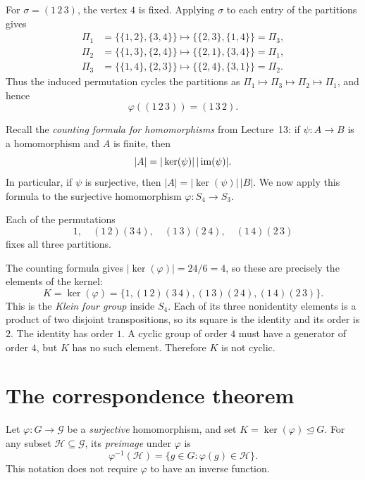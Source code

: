\documentclass[reqno,11pt]{amsart}
\begin{document}
\begin{example}
For $\sigma=(1\,2\,3)$, the vertex $4$ is fixed. Applying $\sigma$ to
each entry of the partitions gives
\[
\begin{aligned}
  \Pi_1&=\bigl\{\{1,2\},\{3,4\}\bigr\}
    \longmapsto\bigl\{\{2,3\},\{1,4\}\bigr\}=\Pi_3,\\
  \Pi_2&=\bigl\{\{1,3\},\{2,4\}\bigr\}
    \longmapsto\bigl\{\{2,1\},\{3,4\}\bigr\}=\Pi_1,\\
  \Pi_3&=\bigl\{\{1,4\},\{2,3\}\bigr\}
    \longmapsto\bigl\{\{2,4\},\{3,1\}\bigr\}=\Pi_2.
\end{aligned}
\]
Thus the induced permutation cycles the partitions as
$\Pi_1\mapsto\Pi_3\mapsto\Pi_2\mapsto\Pi_1$, and hence
\[
  \varphi((1\,2\,3))=(1\,3\,2).
\]
\end{example}

Recall the \emph{counting formula for homomorphisms} from Lecture~13:
if $\psi:A\to B$ is a homomorphism and $A$ is finite, then
\[
  |A|=|\ker(\psi)|\,|\operatorname{im}(\psi)|.
\]
In particular, if $\psi$ is surjective, then
$|A|=|\ker(\psi)|\,|B|$. We now apply this formula to the surjective
homomorphism $\varphi:S_4\to S_3$.

\begin{example}
Each of the permutations
\[
1,\quad (1\,2)(3\,4),\quad (1\,3)(2\,4),\quad (1\,4)(2\,3)
\]
fixes all three partitions.

The counting formula gives
$|\ker(\varphi)|=24/6=4$, so these are precisely the elements of the
kernel:
\[
K=\ker(\varphi)
=\{1,(1\,2)(3\,4),(1\,3)(2\,4),(1\,4)(2\,3)\}.
\]
This is the \emph{Klein four group} inside $S_4$.
Each of its three nonidentity elements is a product of two disjoint
transpositions, so its square is the identity and its order is $2$.
The identity has order $1$. A cyclic group of order $4$ must have a
generator of order $4$, but $K$ has no such element. Therefore $K$
is not cyclic.
\end{example}

\section{The correspondence theorem}

Let $\varphi:G\to\mathcal G$ be a \emph{surjective} homomorphism, and set
$K=\ker(\varphi)\trianglelefteq G$.
For any subset $\mathcal H\subseteq\mathcal G$, its \emph{preimage}
under $\varphi$ is
\[
  \varphi^{-1}(\mathcal H)=\{g\in G:\varphi(g)\in\mathcal H\}.
\]
This notation does not require $\varphi$ to have an inverse function.
\end{document}
